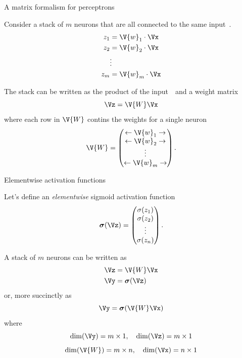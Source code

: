 \documentclass[9pt]{beamer}
\newcommand\bsigma{\boldsymbol{\sigma}}
\begin{document}
\begin{frame}{A matrix formalism for perceptrons}

Consider a stack of $m$ neurons that are all connected to the same input~\Vx.
\begin{align*}
	z_1 &= \V{w}_1\cdot\Vx \\
	z_2 &= \V{w}_2\cdot\Vx \\
	 &\vdots \\
	z_m &= \V{w}_m\cdot\Vx \\
\end{align*}

\pause
The stack can be written as the product of the input~\Vx\ and a weight matrix
\[ \Vz = \V{W}\Vx \]
where each row in $\V{W}$ contins the weights for a single neuron
\[ \V{W} = \begin{pmatrix} \leftarrow \V{w}_1 \rightarrow \\
 						   \leftarrow \V{w}_2 \rightarrow \\
 						    \vdots \\
 						   \leftarrow \V{w}_m \rightarrow \\	
 \end{pmatrix}. \]
	
\end{frame}

\begin{frame}{Elementwise activation functions}

Let's define an \emph{elementwise} sigmoid activation function
\[ \bsigma(\Vz) = \begin{pmatrix} \sigma(z_1) \\ \sigma(z_2) \\ \vdots \\\sigma(z_n) \end{pmatrix}. \]
	
\pause
A stack of $m$ neurons can be written as
\begin{align*}
	\Vz &= \V{W}\Vx \\
	\Vy &= \bsigma(\Vz)	
\end{align*}
\pause
or, more succinctly as
\[ \Vy = \bsigma(\V{W}\Vx) \]
\pause
where
\[ \dim(\Vy)=m\times 1,\quad \dim(\Vz)=m\times 1 \]
\[ \dim(\V{W})=m\times n,\quad \dim(\Vx)=n\times 1 \]
\end{frame}
\end{document}
